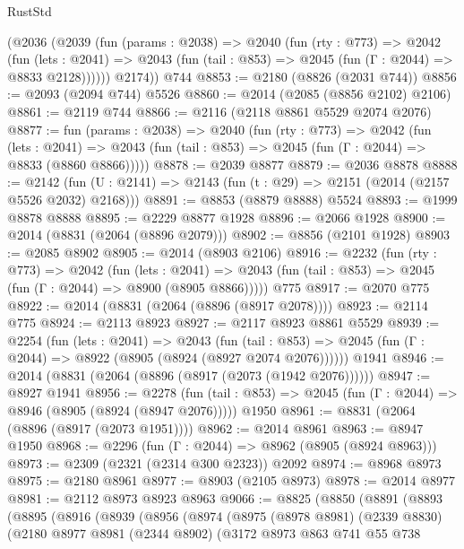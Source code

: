 \begin{lexlean}{RustStd}
\begin{coremodule}
      (@2036
        (@2039
          (fun (params : @2038) =>
          @2040
            (fun (rty : @773) =>
            @2042
              (fun (lets : @2041) =>
              @2043 (fun (tail : @853) => @2045 (fun (Γ : @2044) => @8833 @2128))))))
        @2174))
    @744
@8853 := @2180 (@8826 (@2031 @744))
@8856 := @2093 (@2094 @744) @5526
@8860 := @2014 (@2085 (@8856 @2102) @2106)
@8861 := @2119 @744
@8866 := @2116 (@2118 @8861 @5529 @2074 @2076)
@8877 := fun (params : @2038) =>
  @2040
    (fun (rty : @773) =>
    @2042
      (fun (lets : @2041) =>
      @2043 (fun (tail : @853) => @2045 (fun (Γ : @2044) => @8833 (@8860 @8866)))))
@8878 := @2039 @8877
@8879 := @2036 @8878
@8888 := @2142 (fun (U : @2141) => @2143 (fun (t : @29) => @2151 (@2014 (@2157 @5526 @2032) @2168)))
@8891 := @8853 (@8879 @8888) @5524
@8893 := @1999 @8878 @8888
@8895 := @2229 @8877 @1928
@8896 := @2066 @1928
@8900 := @2014 (@8831 (@2064 (@8896 @2079)))
@8902 := @8856 (@2101 @1928)
@8903 := @2085 @8902
@8905 := @2014 (@8903 @2106)
@8916 := @2232
    (fun (rty : @773) =>
    @2042
      (fun (lets : @2041) =>
      @2043 (fun (tail : @853) => @2045 (fun (Γ : @2044) => @8900 (@8905 @8866)))))
    @775
@8917 := @2070 @775
@8922 := @2014 (@8831 (@2064 (@8896 (@8917 @2078))))
@8923 := @2114 @775
@8924 := @2113 @8923
@8927 := @2117 @8923 @8861 @5529
@8939 := @2254
    (fun (lets : @2041) =>
    @2043
      (fun (tail : @853) => @2045 (fun (Γ : @2044) => @8922 (@8905 (@8924 (@8927 @2074 @2076))))))
    @1941
@8946 := @2014 (@8831 (@2064 (@8896 (@8917 (@2073 (@1942 @2076))))))
@8947 := @8927 @1941
@8956 := @2278
    (fun (tail : @853) => @2045 (fun (Γ : @2044) => @8946 (@8905 (@8924 (@8947 @2076)))))
    @1950
@8961 := @8831 (@2064 (@8896 (@8917 (@2073 @1951))))
@8962 := @2014 @8961
@8963 := @8947 @1950
@8968 := @2296 (fun (Γ : @2044) => @8962 (@8905 (@8924 @8963)))
@8973 := @2309 (@2321 (@2314 @300 @2323)) @2092
@8974 := @8968 @8973
@8975 := @2180 @8961
@8977 := @8903 (@2105 @8973)
@8978 := @2014 @8977
@8981 := @2112 @8973 @8923 @8963
@9066 := @8825
    (@8850
      (@8891
        (@8893
          (@8895
            (@8916
              (@8939
                (@8956
                  (@8974
                    (@8975
                      (@8978 @8981)
                      (@2339 @8830)
                      (@2180
                        @8977
                        @8981
                        (@2344 @8902)
                        (@3172
                          @8973
                          @863
                          @741
                          @55
                          @738

\end{coremodule}
\end{lexlean}
